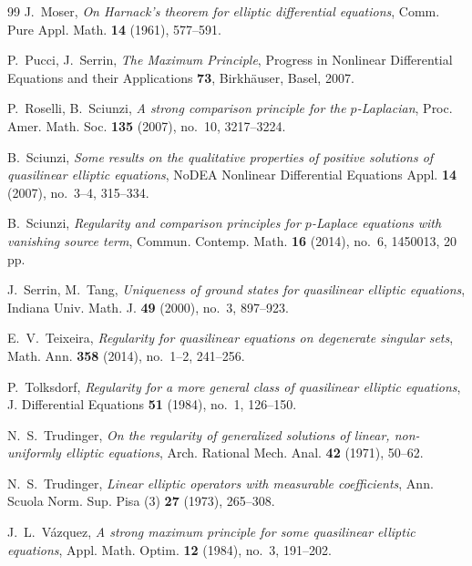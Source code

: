 \documentclass[reqno]{amsart}
\theoremstyle{plain}
\theoremstyle{definition}
\theoremstyle{remark}
\begin{document}
\begin{thebibliography}{99}
 J.~Moser, \emph{On Harnack's theorem for elliptic differential equations}, Comm.
Pure Appl. Math. \textbf{14} (1961), 577--591.

 P.~Pucci, J.~Serrin, \emph{The Maximum Principle}, Progress in Nonlinear
Differential Equations and their Applications \textbf{73}, Birkh\"auser, Basel, 2007.

 P.~Roselli, B.~Sciunzi, \emph{A strong comparison principle for the $p$-Laplacian},
Proc. Amer. Math. Soc. \textbf{135} (2007), no.~10, 3217--3224.

 B.~Sciunzi, \emph{Some results on the qualitative properties of positive solutions of
quasilinear elliptic equations}, NoDEA Nonlinear Differential Equations Appl. \textbf{14} (2007),
no.~3--4, 315--334.

 B.~Sciunzi, \emph{Regularity and comparison principles for $p$-Laplace equations with
vanishing source term}, Commun. Contemp. Math. \textbf{16} (2014), no.~6, 1450013, 20 pp.

 J.~Serrin, M.~Tang, \emph{Uniqueness of ground states for quasilinear elliptic
equations}, Indiana Univ. Math. J. \textbf{49} (2000), no.~3, 897--923.

 E.~V.~Teixeira, \emph{Regularity for quasilinear equations on degenerate singular
sets}, Math. Ann. \textbf{358} (2014), no.~1--2, 241--256.

 P.~Tolksdorf, \emph{Regularity for a more general class of quasilinear elliptic
equations}, J. Differential Equations \textbf{51} (1984), no.~1, 126--150.

 N.~S.~Trudinger, \emph{On the regularity of generalized solutions of linear,
non-uniformly elliptic equations}, Arch. Rational Mech. Anal. \textbf{42} (1971), 50--62.

 N.~S.~Trudinger, \emph{Linear elliptic operators with measurable coefficients}, Ann.
Scuola Norm. Sup. Pisa (3) \textbf{27} (1973), 265--308.

 J.~L.~V\'azquez, \emph{A strong maximum principle for some quasilinear elliptic
equations}, Appl. Math. Optim. \textbf{12} (1984), no.~3, 191--202.

\end{thebibliography}
\end{document}

